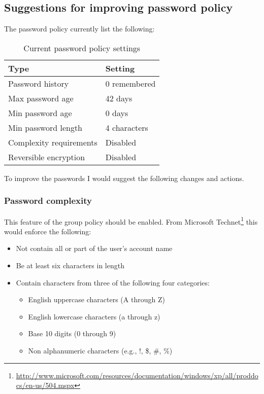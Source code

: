\subsection{Suggestions for improving password policy}
The password policy currently list the following:

\begin{table}[h!]
\centering
\begin{tabular}{ l | l }
\textbf{Type} & \textbf{Setting} \\ \hline
Password history        & 0 remembered \\ \hline
Max password age        & 42 days \\ \hline
Min password age        & 0 days \\ \hline
Min password length     & 4 characters \\ \hline
Complexity requirements & Disabled \\ \hline
Reversible encryption   & Disabled
\end{tabular}
\caption{Current password policy settings}
\label{tab:passpolicy}
\end{table}

To improve the passwords I would suggest the following changes and actions.

\subsubsection{Password complexity}
This feature of the group policy should be enabled. From Microsoft
Technet\footnote{
\href{http://www.microsoft.com/resources/documentation/windows/xp/all/proddocs/en-us/504.mspx}
{http://www.microsoft.com/resources/documentation/windows/xp/all/proddocs/en-us/504.mspx}}
this would enforce the following:

\begin{itemize}
\item Not contain all or part of the user's account name
\item Be at least six characters in length  
\item Contain characters from three of the following four categories:
\begin{itemize}
    \item English uppercase characters (A through Z)
    \item English lowercase characters (a through z)
    \item Base 10 digits (0 through 9)
    \item Non alphanumeric characters (e.g., !, \$, \#, \%)
\end{itemize}
\end{itemize}

